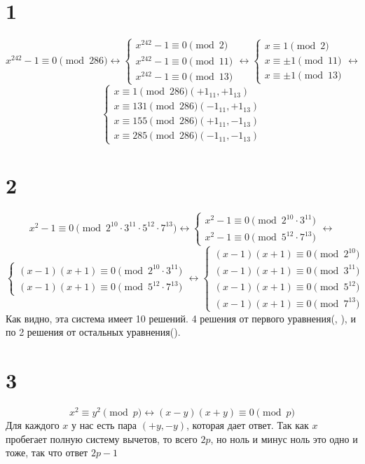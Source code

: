 

	\section*{1}
	$$x^{242}-1 \equiv 0 \pmod {286}\leftrightarrow \begin{cases}x^{242}-1 \equiv 0 \pmod {2} \\
	x^{242}-1 \equiv 0 \pmod {11}\\
	x^{242}-1 \equiv 0 \pmod {13}\end{cases}\leftrightarrow \begin{cases}x \equiv 1 \pmod {2} \\
	x\equiv \pm1 \pmod {11}\\
	x \equiv \pm1 \pmod {13}\end{cases} \leftrightarrow $$
	$$\begin{cases}
		x \equiv 1\pmod{286}(+1_{11}, +1_{13})\\
		x\equiv 131 \pmod{286} (-1_{11}, +1_{13})\\
		x\equiv 155 \pmod{286}(+1_{11}, -1_{13})\\
		x\equiv 285 \pmod{286}(-1_{11}, -1_{13})
	\end{cases}$$
	\section*{2}
	$$x^2-1\equiv0 \pmod{2^{10}\cdot3^{11}\cdot 5^{12}\cdot7^{13}}\leftrightarrow \begin{cases}x^2-1\equiv0 \pmod{{2^{10}\cdot3^{11}}}\\
		x^2-1\equiv0 \pmod{{5^{12}\cdot7^{13}}}
	\end{cases}\leftrightarrow$$
	$$\begin{cases}(x-1)(x+1)\equiv0 \pmod{{2^{10}\cdot3^{11}}}\\
		(x-1)(x+1)\equiv0\pmod{{5^{12}\cdot7^{13}}}
	\end{cases} \leftrightarrow 
	\begin{cases}
		(x-1)(x+1)\equiv0 \pmod{{2^{10}}}\\
		(x-1)(x+1)\equiv0 \pmod{{3^{11}}}\\
		(x-1)(x+1)\equiv0\pmod{{5^{12}}}\\
			(x-1)(x+1)\equiv0\pmod{{7^{13}}}\
	\end{cases}$$ Как видно, эта система имеет 10 решений.
	4 решения от первого уравнения(, ), и по 2 решения от остальных уравнения().
	\section*{3}
	$$x^2\equiv y^2 \pmod p \leftrightarrow (x-y)(x+y)\equiv 0 \pmod p$$
	Для каждого $x $ у нас есть пара $(+y,-y)$, которая дает ответ. Так как $x $ пробегает полную систему вычетов, то всего $2p$, но ноль и минус ноль это одно и тоже, так что ответ $2p-1$
